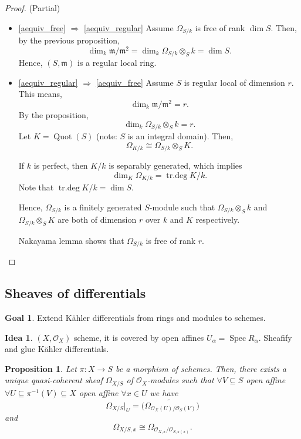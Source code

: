 \documentclass[12pt]{article}
\DeclareMathOperator{\Spec}{Spec}
\DeclareMathOperator{\Quot}{Quot}
\DeclareMathOperator{\trdeg}{tr.deg}
\newtheorem*{proposition}{Proposition}
\theoremstyle{definition}
\newtheorem*{goal}{Goal}
\newtheorem*{idea}{Idea}
\begin{document}
\begin{proof}
(Partial)
\begin{itemize}
\item \ref{aequiv_free} $\Rightarrow$ \ref{aequiv_regular} Assume $\Omega_{S/k}$ is free of rank $\dim S$. Then, by the previous proposition,
\[\dim_k\mathfrak m/\mathfrak m^2=\dim_k\Omega_{S/k}\otimes_Sk=\dim S.\]
Hence, $(S,\mathfrak m)$ is a regular local ring.
\item \ref{aequiv_regular} $\Rightarrow$ \ref{aequiv_free} Assume $S$ is regular local of dimension $r$. This means,
\[\dim_k\mathfrak m/\mathfrak m^2=r.\]
By the proposition,
\[\dim_k\Omega_{S/k}\otimes_Sk=r.\]
Let $K=\Quot(S)$ (note: $S$ is an integral domain). Then,
\[\Omega_{K/k}\cong\Omega_{S/k}\otimes_SK.\]

If $k$ is perfect, then $K/k$ is separably generated, which implies
\[\dim_K\Omega_{K/k}=\trdeg K/k.\]
Note that $\trdeg K/k=\dim S$.

Hence, $\Omega_{S/k}$ is a finitely generated $S$-module such that $\Omega_{S/k}\otimes_Sk$ and $\Omega_{S/k}\otimes_SK$ are both of dimension $r$ over $k$ and $K$ respectively.

Nakayama lemma shows that $\Omega_{S/k}$ is free of rank $r$.
\end{itemize}
\end{proof}

\subsection*{Sheaves of differentials}
\begin{goal}
Extend K\"ahler differentials from rings and modules to schemes.
\end{goal}

\begin{idea}
$(X,\mathcal O_X)$ scheme, it is covered by open affines $U_\alpha=\Spec R_\alpha$. Sheafify and glue K\"ahler differentials.
\end{idea}

\begin{proposition}
Let $\pi:X\rightarrow S$ be a morphism of schemes. Then, there exists a unique quasi-coherent sheaf $\Omega_{X/S}$ of $\mathcal O_X$-modules such that $\forall V\subseteq S$ open affine $\forall U\subseteq\pi^{-1}(V)\subseteq X$ open affine $\forall x\in U$ we have
\[\Omega_{X/S}|_U=\widetilde{\big(\Omega_{\mathcal O_X(U)/\mathcal O_S(V)}\big)}\]
and
\[\Omega_{X/S,x}\cong\Omega_{\mathcal O_{X,x}/\mathcal O_{S,\pi(x)}}.\]
\end{proposition}
\end{document}
